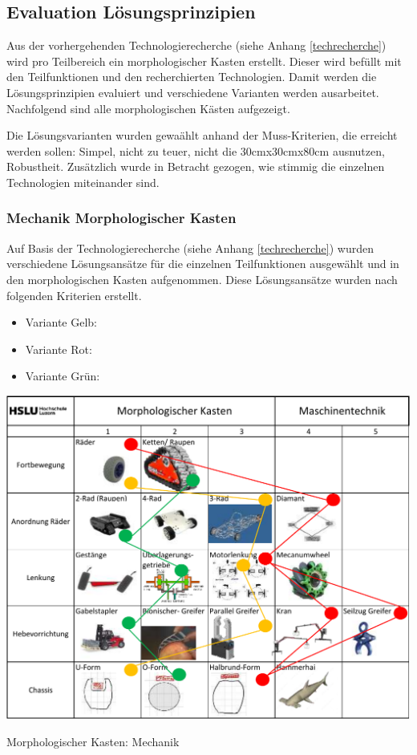 \subsection{Evaluation Lösungsprinzipien}\label{mk}

Aus der vorhergehenden Technologierecherche (siehe Anhang \ref{techrecherche}) wird pro Teilbereich ein morphologischer Kasten erstellt. Dieser wird befüllt mit den Teilfunktionen und den recherchierten Technologien. Damit werden die Lösungsprinzipien evaluiert und verschiedene Varianten werden ausarbeitet. Nachfolgend sind alle morphologischen Kästen aufgezeigt.

Die Lösungsvarianten wurden gewaählt anhand der Muss-Kriterien, die erreicht werden sollen: Simpel, nicht zu teuer, nicht die 30cmx30cmx80cm ausnutzen, Robustheit. Zusätzlich wurde in Betracht gezogen, wie stimmig die einzelnen Technologien miteinander sind.

\subsubsection{Mechanik Morphologischer Kasten}

Auf Basis der Technologierecherche (siehe Anhang \ref{techrecherche}) wurden verschiedene Lösungsansätze für die einzelnen Teilfunktionen ausgewählt und in den morphologischen Kasten aufgenommen.  Diese Lösungsansätze wurden nach folgenden Kriterien erstellt.

\begin{itemize}
    \item Variante Gelb:
    \item Variante Rot:
    \item Variante Grün:
\end{itemize}


\begin{table}[H]
\centering
\includegraphics[width=\textwidth]{assets/MK_Maschinentechnik.pdf}
\caption{Morphologischer Kasten: Mechanik}
\label{table:mk-mechanik}
\end{table}


